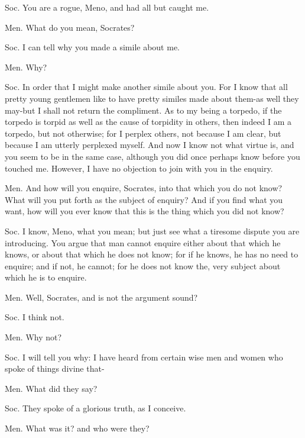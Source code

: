 Soc. You are a rogue, Meno, and had all but caught me. 

Men. What do you mean, Socrates? 

Soc. I can tell why you made a simile about me. 

Men. Why? 

Soc. In order that I might make another simile about you. For I know
that all pretty young gentlemen like to have pretty similes made about
them-as well they may-but I shall not return the compliment. As to
my being a torpedo, if the torpedo is torpid as well as the cause
of torpidity in others, then indeed I am a torpedo, but not otherwise;
for I perplex others, not because I am clear, but because I am utterly
perplexed myself. And now I know not what virtue is, and you seem
to be in the same case, although you did once perhaps know before
you touched me. However, I have no objection to join with you in the
enquiry. 

Men. And how will you enquire, Socrates, into that which you do not
know? What will you put forth as the subject of enquiry? And if you
find what you want, how will you ever know that this is the thing
which you did not know? 

Soc. I know, Meno, what you mean; but just see what a tiresome dispute
you are introducing. You argue that man cannot enquire either about
that which he knows, or about that which he does not know; for if
he knows, he has no need to enquire; and if not, he cannot; for he
does not know the, very subject about which he is to enquire.

Men. Well, Socrates, and is not the argument sound? 

Soc. I think not. 

Men. Why not? 

Soc. I will tell you why: I have heard from certain wise men and women
who spoke of things divine that- 

Men. What did they say? 

Soc. They spoke of a glorious truth, as I conceive. 

Men. What was it? and who were they? 

